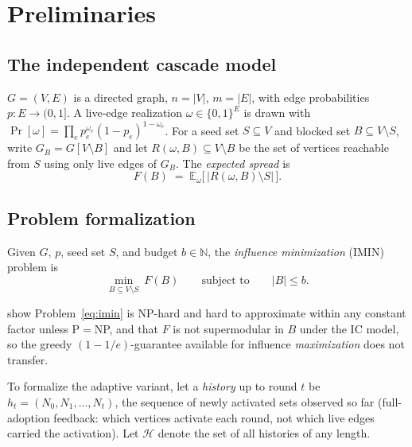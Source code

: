 \documentclass[ASNA,number]{USG}
\newcommand{\Rspread}{R}
\newcommand{\FF}{F}
\begin{document}
\section{Preliminaries}\label{sec:prelim}

\subsection{The independent cascade model}\label{sec:ic-model}

$G=(V,E)$ is a directed graph,
$n=|V|$, $m=|E|$, with edge probabilities $p:E\to(0,1]$. A live-edge
realization $\omega\in\{0,1\}^E$ is drawn with
$\Pr[\omega]=\prod_{e}p_e^{\omega_e}(1-p_e)^{1-\omega_e}$. For a seed set
$S\subseteq V$ and blocked set $B\subseteq V\setminus S$, write
$G_B=G[V\setminus B]$ and let $\Rspread(\omega,B)\subseteq V\setminus B$ be
the set of vertices reachable from $S$ using only live edges of $G_B$. The
\emph{expected spread} is
\begin{equation}\label{eq:spread}
\FF(B)\;=\;\mathbb E_\omega\bigl[\,|\Rspread(\omega,B)\setminus S|\,\bigr].
\end{equation}

\subsection{Problem formalization}\label{sec:formalization}

\begin{definition}\label{def:imin}
Given $G$, $p$, seed set $S$, and budget $b\in\mathbb N$, the
\emph{influence minimization} (IMIN) problem is
\begin{equation}\label{eq:imin}
\min_{B\subseteq V\setminus S}\ \FF(B)
\qquad\text{subject to}\qquad
|B|\le b.
\end{equation}
\end{definition}

\noindent \citet{xie2023} show Problem~\eqref{eq:imin} is NP-hard and hard
to approximate within any constant factor unless P$=$NP, and that $\FF$ is
not supermodular in $B$ under the IC model, so the greedy
$(1-1/e)$-guarantee available for influence \emph{maximization}
\citep{kempe2003} does not transfer.

To formalize the adaptive variant, let a \emph{history} up to round $t$ be
$h_t=(N_0,N_1,\dots,N_t)$, the sequence of newly activated sets observed so
far (full-adoption feedback: which vertices activate each round, not which
live edges carried the activation). Let $\mathcal H$ denote the set of all
histories of any length.
\end{document}
